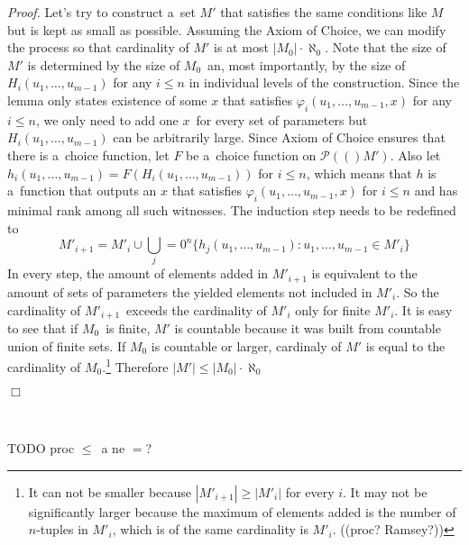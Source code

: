 \documentclass[12pt,a4paper]{article}
\newenvironment{proof}
{\noindent \textit{Proof.}}
{\hspace*{\fill} $\Box$}
\newcommand{\power}[1]{\ensuremath{\mathscr{P}} (#1)}
\begin{document}
\begin{proof}
Let's try to construct a~set $M'$ that satisfies the same conditions like $M$ but is kept as small as possible. Assuming the Axiom of Choice, we can modify the process so that cardinality of $M'$ is at most $|M_0| \cdot \aleph_0$. Note that the size of $M'$ is determined by the size of $M_0$ an, most importantly, by the size of $H_i(u_1, \ldots, u_{m-1})$ for any $i \leq n$ in individual levels of the construction. Since the lemma only states existence of some $x$ that satisfies $\varphi_i(u_1, \ldots, u_{m-1}, x)$ for any $i \leq n$, we only need to add one $x$ for every set of parameters but $H_i(u_1, \dots, u_{m-1})$ can be arbitrarily large. Since Axiom of Choice ensures that there is a~choice function, let $F$ be a~choice function on $\power(M')$. Also let $h_i(u_1, \ldots, u_{m-1}) = F(H_i(u_1, \ldots, u_{m-1}))$ for $i \leq n$, which means that $h$ is a~function that outputs an $x$ that satisfies $\varphi_i(u_1, \ldots, u_{m-1}, x)$ for $i \leq n$ and has minimal rank among all such witnesses. The induction step needs to be redefined to
\begin{equation}
M'_{i+1} = M'_i \cup \bigcup_j=0^n \{ h_j(u_1, \ldots, u_{m-1}): u_1, \ldots, u_{m-1} \in M'_i \}
\end{equation}
In every step, the amount of elements added in $M'_{i+1}$ is equivalent to the amount of sets of parameters the yielded elements not included in $M'_i$. So the cardinality of $M'_{i+1}$ exceeds the cardinality of $M'_i$ only for finite $M'_i$. It is easy to see that if $M_0$ is finite, $M'$ is countable because it was built from countable union of finite sets. If $M_0$ is countable or larger, cardinaly of $M'$ is equal to the cardinality of $M_0$.\footnote{It can not be smaller because $|M'_{i+1}|  \geq |M'_i|$ for every $i$. It may not be significantly larger because the maximum of elements added is the number of $n$-tuples in $M'_i$, which is of the same cardinality is $M'_i$. ((proc? Ramsey?))}
Therefore $|M'| \leq |M_0| \cdot \aleph_0$

\end{proof}
  
 \
 
TODO proc $\leq$ a ne $=$?
\end{document}
